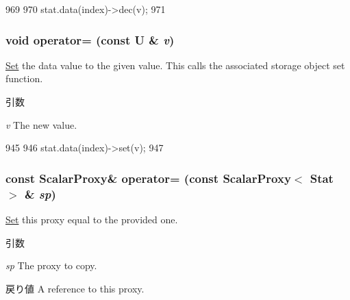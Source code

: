 \begin{DoxyCode}
969     {
970         stat.data(index)->dec(v);
971     }
\end{DoxyCode}
\hypertarget{classStats_1_1ScalarProxy_a0f6b0032b20a50bedaf20aab2f87f09d}{
\subsubsection[{operator=}]{\setlength{\rightskip}{0pt plus 5cm}void operator= (const U \& {\em v})}}
\label{classStats_1_1ScalarProxy_a0f6b0032b20a50bedaf20aab2f87f09d}
\hyperlink{classSet}{Set} the data value to the given value. This calls the associated storage object set function. 
\begin{DoxyParams}{引数}
\item[{\em v}]The new value. \end{DoxyParams}



\begin{DoxyCode}
945     {
946         stat.data(index)->set(v);
947     }
\end{DoxyCode}
\hypertarget{classStats_1_1ScalarProxy_a413a4ac6f4c69aa51df50a0c29a6184c}{
\subsubsection[{operator=}]{\setlength{\rightskip}{0pt plus 5cm}const {\bf ScalarProxy}\& operator= (const {\bf ScalarProxy}$<$ Stat $>$ \& {\em sp})}}
\label{classStats_1_1ScalarProxy_a413a4ac6f4c69aa51df50a0c29a6184c}
\hyperlink{classSet}{Set} this proxy equal to the provided one. 
\begin{DoxyParams}{引数}
\item[{\em sp}]The proxy to copy. \end{DoxyParams}
\begin{DoxyReturn}{戻り値}
A reference to this proxy. 
\end{DoxyReturn}



